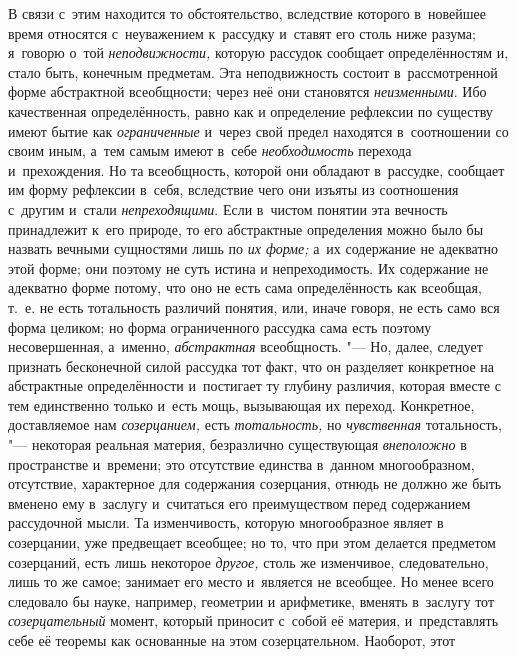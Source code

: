 В связи с~этим находится то обстоятельство, вследствие которого в~новейшее
время относятся с~неуважением к~рассудку и~ставят его столь ниже
разума; я~говорю о~той {\em неподвижности,} которую
рассудок сообщает определённостям и, стало быть, конечным предметам. Эта
неподвижность состоит в~рассмотренной форме абстрактной всеобщности; через неё
они становятся {\em неизменными}. Ибо качественная определённость, равно как и
определение рефлексии по существу имеют бытие как {\em ограниченные} и~через
свой предел находятся в~соотношении со своим иным, а~тем самым имеют в~себе
{\em необходимость} перехода и~прехождения. Но та всеобщность, которой они
обладают в~рассудке, сообщает им форму рефлексии в~себя, вследствие чего они
изъяты из соотношения с~другим и~стали {\em непреходящими}. Если в~чистом
понятии эта вечность принадлежит к~его природе, то его абстрактные определения
можно было бы назвать вечными сущностями лишь по {\em их форме;} а~их
содержание не адекватно этой форме; они поэтому не суть истина и
непреходимость. Их содержание не адекватно форме потому, что оно не есть сама
определённость как всеобщая, т.~е. не есть тотальность различий понятия, или,
иначе говоря, не есть само вся форма целиком; но форма ограниченного рассудка
сама есть поэтому несовершенная, а~именно, {\em абстрактная}
всеобщность. "--- Но, далее, следует признать
бесконечной силой рассудка тот факт, что он разделяет конкретное на
абстрактные определённости и~постигает ту глубину различия, которая вместе
с тем единственно только и~есть мощь, вызывающая их переход. Конкретное,
доставляемое нам {\em созерцанием,} есть {\em тотальность,} но
{\em чувственная} тотальность, "--- некоторая реальная материя,
безразлично существующая {\em внеположно} в
пространстве и~времени; это отсутствие единства в~данном многообразном,
отсутствие, характерное для содержания созерцания, отнюдь не должно же быть
вменено ему в~заслугу и~считаться его преимуществом перед содержанием
рассудочной мысли. Та изменчивость, которую многообразное являет в
созерцании, уже предвещает всеобщее; но то, что при этом делается предметом
созерцаний, есть лишь некоторое
{\em другое,} столь же
изменчивое, следовательно, лишь то же самое; занимает его место и~является
не всеобщее. Но менее всего следовало бы науке, например, геометрии и
арифметике, вменять в~заслугу тот
{\em созерцательный}
момент, который приносит с~собой её материя, и~представлять
себе её теоремы как основанные на этом созерцательном. Наоборот, этот
